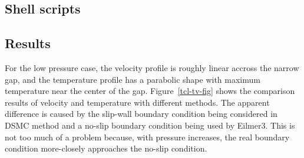 \noindent\topbar

\bottombar


\subsection{Shell scripts}
\label{tc-sh-files}
\topbar

\bottombar

\noindent
\topbar

\bottombar

\noindent
\topbar

\bottombar


\subsection{Results}
%
For the low pressure case, the velocity profile is roughly linear accross the narrow gap, and the temperature
profile has a parabolic shape with maximum temperature near the center of the gap. 
Figure~\ref{tcl-tv-fig} shows the comparison results of velocity and temperature with different methods.
The apparent difference is caused by the slip-wall boundary condition being considered in DSMC method and
a no-slip boundary condition being used by Eilmer3. 
This is not too much of a problem because, with pressure increases, 
the real boundary condition more-closely approaches the no-slip condition.

